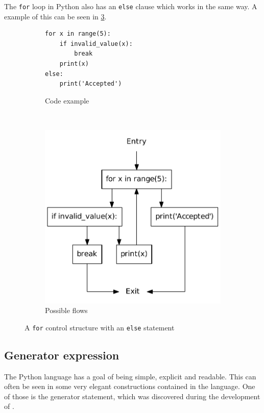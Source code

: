 The \texttt{for} loop in Python also has an \texttt{else} clause which works in the same way.
A example of this can be seen in \cref{python:for:else}.

\begin{figure}
  \centering
  \begin{subfigure}[b]{0.4\textwidth}
    \begin{lstlisting}[style=python]
for x in range(5):
    if invalid_value(x):
        break
    print(x)
else:
    print('Accepted')
    \end{lstlisting}
    \caption{Code example}\label{python:for:else:code}
  \end{subfigure}
  ~ %
  \begin{subfigure}[b]{0.4\textwidth}
    \centering
    \includegraphics[scale=.5]{./figures/for_else.pdf}
    \caption{Possible flows}
    \label{python:for:else:flow}
  \end{subfigure}
  \caption{A \texttt{for} control structure with an \texttt{else} statement}
  \label{python:for:else}
\end{figure}

\subsection{Generator expression}
The Python language has a goal of being simple, explicit and readable\citep{python_zen}.
This can often be seen in some very elegant constructions contained in the language.
One of those is the generator statement, which was discovered during the development of \pyt{}.

